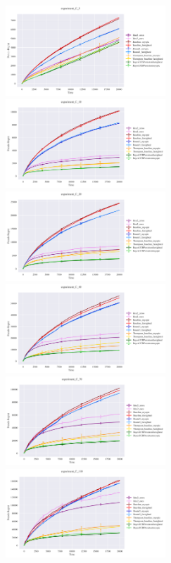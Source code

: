 \begin{figure}
	\centering
	\includegraphics[width=6cm]{./images/C/experiment_C_5 ANALYTICS.png}\quad\includegraphics[width=6cm]{./images/C/experiment_C_10 ANALYTICS.png} 
	\includegraphics[width=6cm]{./images/C/experiment_C_20 ANALYTICS.png}\quad\includegraphics[width=6cm]{./images/C/experiment_C_40 ANALYTICS.png}
	\includegraphics[width=6cm]{./images/C/experiment_C_70 ANALYTICS.png}\quad\includegraphics[width=6cm]{./images/C/experiment_C_110 ANALYTICS.png}

\end{figure}
